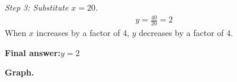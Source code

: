 \documentclass[11pt]{article}
\begin{document}
\textit{Step 3: Substitute \( x = 20 \).}
\[\begin{gathered}
y = \frac{40}{20} = 2
\end{gathered}\]
When \( x \) increases by a factor of 4, \( y \) decreases by a factor of 4.

\begin{answerbox}
\textbf{Final answer:}\quad \(\displaystyle  y = 2 \)
\end{answerbox}
\textbf{Graph.}

\begin{center}
\end{center}
\end{document}
